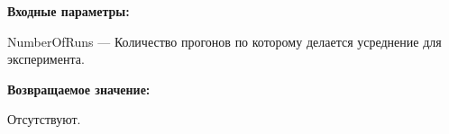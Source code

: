 \textbf{Входные параметры:}

NumberOfRuns --- Количество прогонов по которому делается усреднение для эксперимента.

\textbf{Возвращаемое значение:}

Отсутствуют.